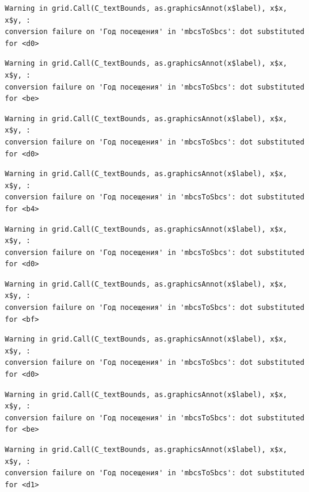 \documentclass[
  letterpaper,
  DIV=11,
  numbers=noendperiod]{scrartcl}
\begin{document}
\begin{verbatim}
Warning in grid.Call(C_textBounds, as.graphicsAnnot(x$label), x$x, x$y, :
conversion failure on 'Год посещения' in 'mbcsToSbcs': dot substituted for <d0>
\end{verbatim}

\begin{verbatim}
Warning in grid.Call(C_textBounds, as.graphicsAnnot(x$label), x$x, x$y, :
conversion failure on 'Год посещения' in 'mbcsToSbcs': dot substituted for <be>
\end{verbatim}

\begin{verbatim}
Warning in grid.Call(C_textBounds, as.graphicsAnnot(x$label), x$x, x$y, :
conversion failure on 'Год посещения' in 'mbcsToSbcs': dot substituted for <d0>
\end{verbatim}

\begin{verbatim}
Warning in grid.Call(C_textBounds, as.graphicsAnnot(x$label), x$x, x$y, :
conversion failure on 'Год посещения' in 'mbcsToSbcs': dot substituted for <b4>
\end{verbatim}

\begin{verbatim}
Warning in grid.Call(C_textBounds, as.graphicsAnnot(x$label), x$x, x$y, :
conversion failure on 'Год посещения' in 'mbcsToSbcs': dot substituted for <d0>
\end{verbatim}

\begin{verbatim}
Warning in grid.Call(C_textBounds, as.graphicsAnnot(x$label), x$x, x$y, :
conversion failure on 'Год посещения' in 'mbcsToSbcs': dot substituted for <bf>
\end{verbatim}

\begin{verbatim}
Warning in grid.Call(C_textBounds, as.graphicsAnnot(x$label), x$x, x$y, :
conversion failure on 'Год посещения' in 'mbcsToSbcs': dot substituted for <d0>
\end{verbatim}

\begin{verbatim}
Warning in grid.Call(C_textBounds, as.graphicsAnnot(x$label), x$x, x$y, :
conversion failure on 'Год посещения' in 'mbcsToSbcs': dot substituted for <be>
\end{verbatim}

\begin{verbatim}
Warning in grid.Call(C_textBounds, as.graphicsAnnot(x$label), x$x, x$y, :
conversion failure on 'Год посещения' in 'mbcsToSbcs': dot substituted for <d1>
\end{verbatim}
\end{document}
